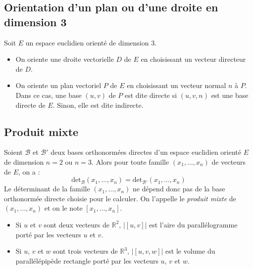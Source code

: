 \documentclass[french,11pt,twoside]{VcCours}
\begin{document}
\subsection{Orientation d'un plan ou d'une droite en dimension 3}
Soit $E$ un espace euclidien orienté de dimension $3$.
\begin{itemize}
\item On oriente une droite vectorielle $D$ de $E$ en choisissant un vecteur directeur de $D$.
\item On oriente un plan vectoriel $P$ de $E$ en choisissant un vecteur normal $n$ à $P$. Dans ce cas, une base $(u,v)$ de $P$ est dite directe si $(u,v,n)$ est une base directe de $E$. Sinon, elle est dite indirecte.
\end{itemize}

\subsection{Produit mixte}

\begin{TheoremeDefinition}{} Soient $\mathcal{B}$ et $\mathcal{B}'$ deux bases orthonormées directes d'un espace euclidien orienté $E$ de dimension $n=2$ ou $n=3$. Alors pour toute famille $(x_1, \ldots, x_n)$ de vecteurs de $E$, on a :
$$ \textrm{det}_{\mathcal{B}}(x_1, \ldots, x_n) =  \textrm{det}_{\mathcal{B}'}(x_1, \ldots, x_n) $$
Le déterminant de la famille $(x_1, \ldots, x_n)$ ne dépend donc pas de la base orthonormée directe choisie pour le calculer. On l'appelle le \emph{produit mixte} de $(x_1, \ldots, x_n)$ et on le note $[x_1, \ldots, x_n]$.
\end{TheoremeDefinition}{}

\begin{Demonstration}{}

\vspace*{5cm}
\end{Demonstration}

\begin{Remarques}{}
\begin{itemize}
\item Si $u$ et $v$ sont deux vecteurs de $\mathbb{R}^2$, $\vert [u,v]\vert$ est l'aire du parallélogramme porté par les vecteurs $u$ et $v$.
\item Si $u$, $v$ et $w$ sont trois vecteurs de $\mathbb{R}^3$, $\vert [u,v,w] \vert$ est le volume du parallélépipède rectangle porté par les vecteurs $u$, $v$ et $w$.
\end{itemize}
\end{Remarques}
\end{document}
